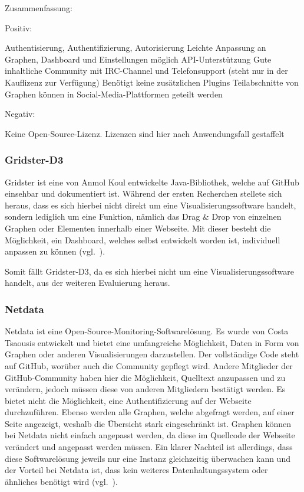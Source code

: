 Zusammenfassung:

Positiv:

\begin{outline}
  \1 Authentisierung, Authentifizierung, Autorisierung
  \1 Leichte Anpassung an Graphen, \gls{Dashboard} und Einstellungen möglich
  \1 \gls{API}\hyp{}Unterstützung
  \1 Gute inhaltliche Community mit IRC\hyp{}Channel und Telefonsupport (steht
  nur in der Kauflizenz zur Verfügung)
  \1 Benötigt keine zusätzlichen Plugins
  \1 Teilabschnitte von Graphen können in Social\hyp{}Media\hyp{}Plattformen
  geteilt werden
\end{outline}

Negativ:

\begin{outline}
  \1 Keine Open\hyp{}Source\hyp{}Lizenz. Lizenzen sind hier nach Anwendungsfall
  gestaffelt
\end{outline}
\mr%

\subsubsection{Gridster-D3}
\label{subsubsec:gridster-d3}
Gridster ist eine von Anmol Koul entwickelte Java\hyp{}Bibliothek, welche auf
\gls{GitHub} einsehbar und dokumentiert ist. Während der ersten Recherchen
stellete sich heraus, dass es sich hierbei nicht direkt um eine
Visualisierungssoftware handelt, sondern lediglich um eine Funktion, nämlich
das Drag \& Drop von einzelnen Graphen oder Elementen innerhalb einer Webseite.
Mit dieser besteht die Möglichkeit, ein \gls{Dashboard}, welches selbst
entwickelt worden ist, individuell anpassen zu können
(vgl.~\cite{gridster-d3}).

Somit fällt Gridster\hyp{}D3, da es sich hierbei nicht um eine
Visualisierungssoftware handelt, aus der weiteren Evaluierung heraus.

\subsubsection{Netdata}
\label{subsubsec:netdata}
Netdata ist eine Open\hyp{}Source\hyp{}Monitoring\hyp{}Softwarelösung. Es wurde
von Costa Tsaousis entwickelt und bietet eine umfangreiche Möglichkeit, Daten
in Form von Graphen oder anderen Visualisierungen darzustellen. Der
vollständige Code steht auf \gls{GitHub}, worüber auch die Community gepflegt
wird. Andere Mitglieder der \gls{GitHub}\hyp{}Community haben hier die
Möglichkeit, Quelltext anzupassen und zu verändern, jedoch müssen diese von
anderen Mitgliedern bestätigt werden. Es bietet nicht die Möglichkeit, eine
Authentifizierung auf der Webseite durchzuführen. Ebenso werden alle Graphen,
welche abgefragt werden, auf einer Seite angezeigt, weshalb die Übersicht stark
eingeschränkt ist. Graphen können bei Netdata nicht einfach angepasst werden,
da diese im Quellcode der Webseite verändert und angepasst werden müssen. Ein
klarer Nachteil ist allerdings, dass diese Softwarelösung jeweils nur eine
Instanz gleichzeitig überwachen kann und der Vorteil bei Netdata ist, dass kein
weiteres Datenhaltungssystem oder ähnliches benötigt wird
(vgl.~\cite{netdata}).

